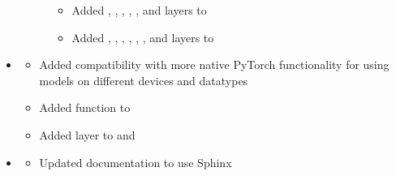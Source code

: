 \documentclass[letterpaper,10pt,english]{sphinxmanual}
\begin{document}
\begin{itemize}
\begin{description}
\begin{itemize}
\item {} 
\sphinxAtStartPar
Added , , , , , and  layers to 

\item {} 
\sphinxAtStartPar
Added , , , , , , and  layers to 

\end{itemize}

\end{description}

\item {} \begin{description}
\begin{itemize}
\item {} 
\sphinxAtStartPar
Added  compatibility with more native PyTorch functionality for using models on different devices and datatypes

\item {} 
\sphinxAtStartPar
Added  function to 

\item {} 
\sphinxAtStartPar
Added  layer to  and 

\end{itemize}

\end{description}

\item {} \begin{description}
\begin{itemize}
\item {} 
\sphinxAtStartPar
Updated documentation to use Sphinx

\end{itemize}

\end{description}

\end{itemize}
\end{document}

